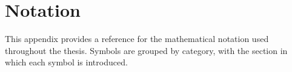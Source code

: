% 
%

\chapter{Notation}\label{app:notation}

This appendix provides a reference for the mathematical notation used throughout the thesis.
Symbols are grouped by category, with the section in which each symbol is introduced.

